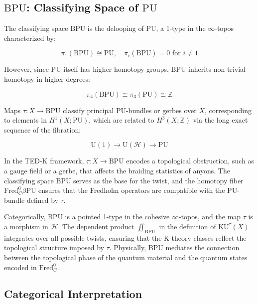 \documentclass{article}
\theoremstyle{definition}
\begin{document}
\subsection{\(\mathrm{BPU}\): Classifying Space of \(\mathrm{PU}\)}
\label{subsec:bpu}

The classifying space \(\mathrm{BPU}\) is the delooping of \(\mathrm{PU}\), a 1-type in the \(\infty\)-topos characterized by:

\begin{equation}
\pi_1(\mathrm{BPU}) \cong \mathrm{PU}, \quad \pi_i(\mathrm{BPU}) = 0 \text{ for } i \neq 1
\end{equation}

However, since \(\mathrm{PU}\) itself has higher homotopy groups, \(\mathrm{BPU}\) inherits non-trivial homotopy in higher degrees:

\begin{equation}
\pi_4(\mathrm{BPU}) \cong \pi_3(\mathrm{PU}) \cong \mathbb{Z}
\end{equation}

Maps \(\tau: X \to \mathrm{BPU}\) classify principal \(\mathrm{PU}\)-bundles or gerbes over \(X\), corresponding to elements in \(H^1(X; \mathrm{PU})\), which are related to \(H^3(X; \mathbb{Z})\) via the long exact sequence of the fibration:

\begin{equation}
\mathrm{U}(1) \to \mathrm{U}(\mathscr{H}) \to \mathrm{PU}
\end{equation}

In the TED-K framework, \(\tau: X \to \mathrm{BPU}\) encodes a topological obstruction, such as a gauge field or a gerbe, that affects the braiding statistics of anyons. The classifying space \(\mathrm{BPU}\) serves as the base for the twist, and the homotopy fiber \(\text{Fred}_C^0 \beta \mathrm{PU}\) ensures that the Fredholm operators are compatible with the \(\mathrm{PU}\)-bundle defined by \(\tau\).

Categorically, \(\mathrm{BPU}\) is a pointed 1-type in the cohesive \(\infty\)-topos, and the map \(\tau\) is a morphism in \(\mathcal{H}\). The dependent product \(\iint_{\mathrm{BPU}}\) in the definition of \(\mathrm{KU}^\tau(X)\) integrates over all possible twists, ensuring that the K-theory classes reflect the topological structure imposed by \(\tau\). Physically, \(\mathrm{BPU}\) mediates the connection between the topological phase of the quantum material and the quantum states encoded in \(\text{Fred}_C^0\).


\subsection{Categorical Interpretation}
\end{document}
